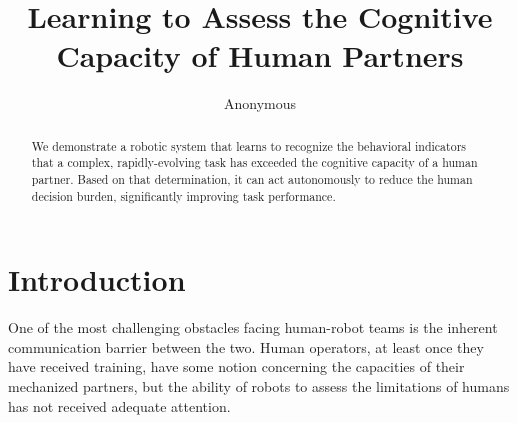 \documentclass{sig-alternate}
\begin{document}
\title{Learning to Assess the Cognitive Capacity of Human Partners}


\author{
%
\alignauthor
Anonymous\\
}

\maketitle
\begin{abstract} 
We demonstrate a robotic system that learns to recognize the
behavioral indicators that a complex, rapidly-evolving task has
exceeded the cognitive capacity of a human partner.  Based on that
determination, it can act autonomously to reduce the human decision
burden, significantly improving task performance.
\end{abstract}




\section{Introduction}
One of the most challenging obstacles facing human-robot teams is the
inherent communication barrier between the two. Human operators, at
least once they have received training, have some notion concerning
the capacities of their mechanized partners, but the ability of robots
to assess the limitations of humans has not received adequate
attention.
\end{document}
